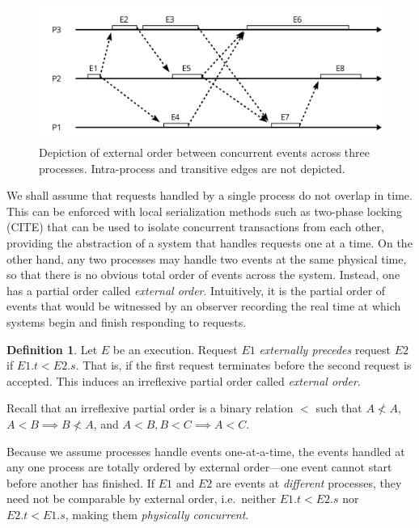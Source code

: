\documentclass[]             %
{NASA}                       %
\theoremstyle{definition}
\newtheorem{definition}{Definition}[section]
\begin{document}
\begin{figure}[h]
  \center
  \includegraphics[scale=0.4]{images/externalorder.png}
  \caption{Depiction of external order between concurrent events across three processes. Intra-process and transitive edges are not depicted.}
  \label{fig:externalorderexec}
\end{figure}

We shall assume that requests handled by a single process do not
overlap in time. This can be enforced with local serialization methods
such as two-phase locking (CITE) that can be used to isolate
concurrent transactions from each other, providing the abstraction of
a system that handles requests one at a time. On the other hand, any
two processes may handle two events at the same physical time, so that
there is no obvious total order of events across the system. Instead,
one has a partial order called \emph{external order}.  Intuitively, it
is the partial order of events that would be witnessed by an observer
recording the real time at which systems begin and finish responding
to requests.

\begin{definition}
  Let $E$ be an execution. Request $E1$ \emph{externally precedes}
  request $E2$ if $E1.t < E2.s$. That is, if the first request
  terminates before the second request is accepted. This induces an
  irreflexive partial order called \emph{external order}.
\end{definition}

Recall that an irreflexive partial order is a binary relation \(<\) such
that \(A \not < A\), \(A < B \implies B \not < A\), and
\(A < B, B < C \implies A < C\).

Because we assume processes handle events one-at-a-time, the events
handled at any one process are totally ordered by external order---one
event cannot start before another has finished. If \(E1\) and \(E2\) are
events at \emph{different} processes, they need not be comparable by
external order, i.e.~neither \(E1.t < E2.s\) nor \(E2.t < E1.s\), making
them \emph{physically concurrent}.
\end{document}

